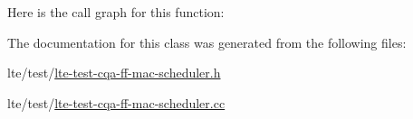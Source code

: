 Here is the call graph for this function\+:




The documentation for this class was generated from the following files\+:\begin{DoxyCompactItemize}
\item 
lte/test/\hyperlink{lte-test-cqa-ff-mac-scheduler_8h}{lte-\/test-\/cqa-\/ff-\/mac-\/scheduler.\+h}\item 
lte/test/\hyperlink{lte-test-cqa-ff-mac-scheduler_8cc}{lte-\/test-\/cqa-\/ff-\/mac-\/scheduler.\+cc}\end{DoxyCompactItemize}
